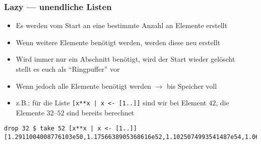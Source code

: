 \documentclass[fleqn,11pt,aspectratio=43]{beamer}
\begin{document}
\begin{frame}[fragile]
\frametitle{Lazy --- unendliche Listen}
\begin{block}{\vspace*{-3ex}}
\begin{itemize}
  \item Es werden vom Start an eine bestimmte Anzahl an Elemente erstellt
  \item Wenn weitere Elemente benötigt werden, werden diese neu erstellt
  \item Wird immer nur ein Abschnitt benötigt, wird der Start wieder gelöscht\\
  		stellt es euch als "`Ringpuffer"' vor
  \item Wenn jedoch alle Elemente benötigt werden $\to$ bis Speicher voll 
  \item z.B.: für die Liste \lstinline![x**x | x <- [1..]]! sind wir bei Element $42$, die Elemente $32$--$52$ sind bereits berechnet
\end{itemize}
\begin{lstlisting}[basicstyle=\tiny]
drop 32 $ take 52 [x**x | x <- [1..]]
[1.2911004008776103e50,1.1756638905368616e52,1.1025074993541487e54,1.0638735892371651e56,1.0555134955777783e58,1.075911801979994e60,1.125951474620712e62,1.2089258196146292e64,1.330877630632712e66,1.5013093754529656e68,1.7343773367030268e70,2.05077382356061e72,2.4806364445134117e74,3.068034630079427e76,3.877924263464449e78,5.007020782634593e80,6.600972468621954e82,8.881784197001252e84,1.2192113050946485e87,1.7067655527413216e89]
\end{lstlisting}
\end{block}
\end{frame}


\end{document}
